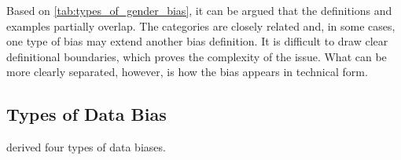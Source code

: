 Based on \autoref{tab:types_of_gender_bias}, it can be argued that the definitions and examples partially overlap. The categories are closely related and, in some cases, one type of bias may extend another bias definition. It is difficult to draw clear definitional boundaries, which proves the complexity of the issue. What can be more clearly separated, however, is how the bias appears in technical form. 







\subsection{Types of Data Bias}
\citet{ullmannGenderBiasMachine2022} derived four types of data biases. 


